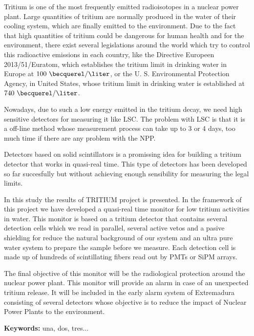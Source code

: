 Tritium is one of the most frequently emitted radioisotopes in a nuclear power plant. Large quantities of tritium are normally produced in the water of their cooling system, which are finally emitted to the environment. Due to the fact that high quantities of tritium could be dangerous for human health and for the environment, there exist several legislations around the world which try to control this radioactive emissions in each country, like the Directive Europeen 2013/51/Euratom, which establishes the tritium limit in drinking water in Europe at $100~\becquerel/\liter$, or the U. S. Environmental Protection Agency, in United States, whose tritium limit in drinking water is established at $740~\becquerel/\liter$.

Nowadays, due to such a low energy emitted in the tritium decay, we need high sensitive detectors for measuring it like LSC. The problem with LSC is that it is a off-line method whose measurement process can take up to 3 or 4 days, too much time if there are any problem with the NPP.

Detectors based on solid scintillators is a promissing idea for building a tritium detector that works in quasi-real time. This type of detectors has been developed so far succesfully but without achieving enough sensibility for measuring the legal limits.

In this study the results of TRITIUM project is presented. In the framework of this project we have developed a quasi-real time monitor for low tritium activities in water. This monitor is based on a tritium detector that contains several detection cells which we read in parallel, several active vetos and a pasive shielding for reduce the natural background of our system and an ultra pure water system to prepare the sample before we measure. Each detection cell is made up of hundreds of scintillating fibers read out by PMTs or SiPM arrays.

The final objective of this monitor will be the radiological protection around the nuclear power plant. This monitor will provide an alarm in case of an unexpected tritium release. It will be included in the early alarm system of Extremadura consisting of several detectors whose objective is to reduce the impact of Nuclear Power Plants to the environment.

\vspace{1cm}

\textbf{Keywords:} una, dos, tres...